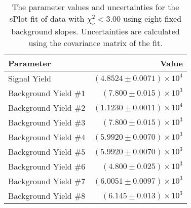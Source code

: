 
\begin{table}[ht]
    \begin{center}
        \begin{tabular}{lr}\toprule
            Parameter & Value \\\midrule
            Signal Yield & $(4.8524 \pm 0.0071) \times 10^{4}$ \\
            Background Yield $\#1$ & $(7.800 \pm 0.015) \times 10^{3}$ \\
            Background Yield $\#2$ & $(1.1230 \pm 0.0011) \times 10^{4}$ \\
            Background Yield $\#3$ & $(7.800 \pm 0.015) \times 10^{3}$ \\
            Background Yield $\#4$ & $(5.9920 \pm 0.0070) \times 10^{3}$ \\
            Background Yield $\#5$ & $(5.9920 \pm 0.0070) \times 10^{3}$ \\
            Background Yield $\#6$ & $(4.800 \pm 0.025) \times 10^{3}$ \\
            Background Yield $\#7$ & $(6.0051 \pm 0.0097) \times 10^{3}$ \\
            Background Yield $\#8$ & $(6.145 \pm 0.013) \times 10^{3}$ \\\bottomrule
        \end{tabular}
        \caption{The parameter values and uncertainties for the sPlot fit of data with $\chi^2_\nu < 3.00$ using eight fixed background slopes. Uncertainties are calculated using the covariance matrix of the fit.}\label{tab:splot-fit-results-chisqdof-3.00-fixed-8}
    \end{center}
\end{table}
